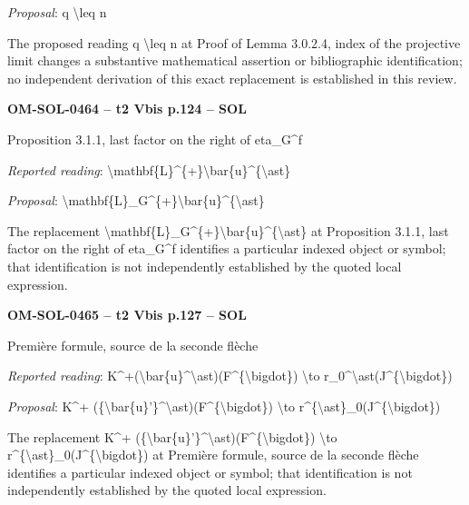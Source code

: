 \emph{Proposal}: q \textbackslash{}leq n\par
The proposed reading q \textbackslash{}leq n at Proof of Lemma 3.0.2.4, index of the projective limit changes a substantive mathematical assertion or bibliographic identification; no independent derivation of this exact replacement is established in this review.\par
\par\noindent\textbf{OM-SOL-0464 -- t2 Vbis p.124 -- SOL}\par
Proposition 3.1.1, last factor on the right of eta\_G\textasciicircum{}f\par
\emph{Reported reading}: \textbackslash{}mathbf\{L\}\textasciicircum{}\{+\}\textbackslash{}bar\{u\}\textasciicircum{}\{\textbackslash{}ast\}\par
\emph{Proposal}: \textbackslash{}mathbf\{L\}\_G\textasciicircum{}\{+\}\textbackslash{}bar\{u\}\textasciicircum{}\{\textbackslash{}ast\}\par
The replacement \textbackslash{}mathbf\{L\}\_G\textasciicircum{}\{+\}\textbackslash{}bar\{u\}\textasciicircum{}\{\textbackslash{}ast\} at Proposition 3.1.1, last factor on the right of eta\_G\textasciicircum{}f identifies a particular indexed object or symbol; that identification is not independently established by the quoted local expression.\par
\par\noindent\textbf{OM-SOL-0465 -- t2 Vbis p.127 -- SOL}\par
Première formule, source de la seconde flèche\par
\emph{Reported reading}: K\textasciicircum{}+(\textbackslash{}bar\{u\}\textasciicircum{}\textbackslash{}ast)(F\textasciicircum{}\{\textbackslash{}bigdot\}) \textbackslash{}to r\_0\textasciicircum{}\textbackslash{}ast(J\textasciicircum{}\{\textbackslash{}bigdot\})\par
\emph{Proposal}: K\textasciicircum{}+ (\{\textbackslash{}bar\{u\}'\}\textasciicircum{}\textbackslash{}ast)(F\textasciicircum{}\{\textbackslash{}bigdot\}) \textbackslash{}to r\textasciicircum{}\{\textbackslash{}ast\}\_0(J\textasciicircum{}\{\textbackslash{}bigdot\})\par
The replacement K\textasciicircum{}+ (\{\textbackslash{}bar\{u\}'\}\textasciicircum{}\textbackslash{}ast)(F\textasciicircum{}\{\textbackslash{}bigdot\}) \textbackslash{}to r\textasciicircum{}\{\textbackslash{}ast\}\_0(J\textasciicircum{}\{\textbackslash{}bigdot\}) at Première formule, source de la seconde flèche identifies a particular indexed object or symbol; that identification is not independently established by the quoted local expression.\par
